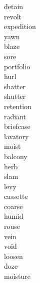 \documentclass[b5paper, 11pt]{ctexart}
\begin{document}
\begin{multicols*}{3}
\begin{description}
\item[detain]

\item[revolt]

\item[expedition]

\item[yawn]

\item[blaze]

\item[sore]

\item[portfolio]

\item[hurl]

\item[shatter]

\item[shutter]

\item[retention]

\item[radiant]

\item[briefcase]

\item[lavatory]

\item[moist]

\item[balcony]

\item[herb]

\item[slam]

\item[levy]

\item[cassette]

\item[coarse]

\item[humid]

\item[rouse]

\item[vein]

\item[void]

\item[loosen]

\item[doze]

\item[moisture]


\end{description}
\end{multicols*}
\end{document}
